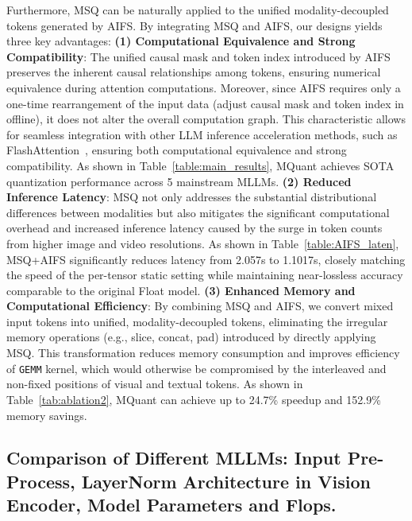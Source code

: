 Furthermore, MSQ can be naturally applied to the unified modality-decoupled tokens generated by AIFS. By integrating MSQ and AIFS, our designs yields three key advantages: \textbf{(1) Computational Equivalence and Strong Compatibility}: The unified causal mask and token index introduced by AIFS preserves the inherent causal relationships among tokens, ensuring numerical equivalence during attention computations. Moreover, since AIFS requires only a one-time rearrangement of the input data (adjust causal mask and token index in offline), it does not alter the overall computation graph. This characteristic allows for seamless integration with other LLM inference acceleration methods, such as FlashAttention~\citep{dao2022flashattention}, ensuring both computational equivalence and strong compatibility. As shown in Table~\ref{table:main_results}, MQuant achieves SOTA quantization performance across 5 mainstream MLLMs. \textbf{(2) Reduced Inference Latency}: MSQ not only addresses the substantial distributional differences between modalities but also mitigates the significant computational overhead and increased inference latency caused by the surge in token counts from higher image and video resolutions. As shown in Table~\ref{table:AIFS_laten}, MSQ+AIFS significantly reduces latency from 2.057s to 1.1017s, closely matching the speed of the per-tensor static setting while maintaining near-lossless accuracy comparable to the original Float model. \textbf{(3) Enhanced Memory and Computational Efficiency}: By combining MSQ and AIFS, we convert mixed input tokens into unified, modality-decoupled tokens, eliminating the irregular memory operations (e.g., slice, concat, pad) introduced by directly applying MSQ. This transformation reduces memory consumption and improves efficiency of \texttt{GEMM} kernel, which would otherwise be compromised by the interleaved and non-fixed positions of visual and textual tokens. As shown in Table~\ref{tab:ablation2}, MQuant can achieve up to 24.7\% speedup and 152.9\% memory savings.

\subsection{Comparison of Different MLLMs: Input Pre-Process, LayerNorm Architecture in Vision Encoder, Model Parameters and Flops.}
\label{MLLMs_comparison}

